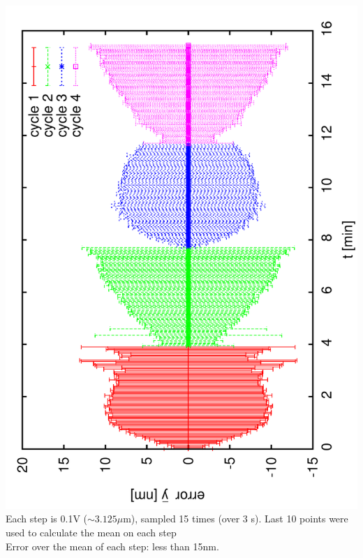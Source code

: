 \documentclass[a4paper,11pt]{book}
\begin{document}
 \includegraphics[angle=-90,scale=0.16]{image25c.pdf}\\
{\tiny Each step is 0.1V ($\sim3.125\mu$m), sampled 15 times (over 3 s).}
{\tiny Last 10 points were used to calculate the mean on each step\\Error over the mean of each step: less than 15nm.}\par
\end{document}
